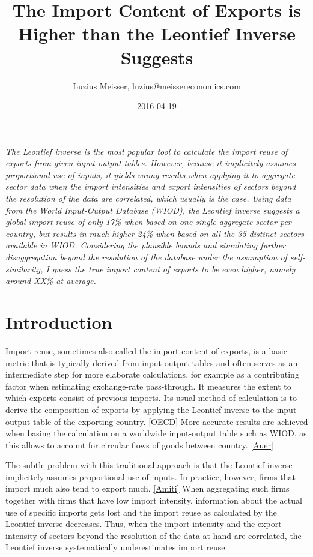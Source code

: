 \documentclass[english]{uzhpub}
\begin{document}
\title{The Import Content of Exports is Higher than the Leontief Inverse Suggests}


\author{Luzius Meisser, luzius@meissereconomics.com}

\date{2016-04-19}

\maketitle

\emph{The Leontief inverse is the most popular tool to calculate the import reuse of exports from given input-output tables. However, because it implicitely assumes proportional use of inputs, it yields wrong results when applying it to aggregate sector data when the import intensities and export intensities of sectors beyond the resolution of the data are correlated, which usually is the case. Using data from the World Input-Output Database (WIOD), the Leontief inverse suggests a global import reuse of only 17\%  when based on one single aggregate sector per country, but results in much higher 24\% when based on all the 35 distinct sectors available in WIOD. Considering the plausible bounds and simulating further disaggregation beyond the resolution of the database under the assumption of self-similarity, I guess the true import content of exports to be even higher, namely around XX\% at average.}

\section{Introduction}
Import reuse, sometimes also called the import content of exports, is a basic metric that is typically derived from input-output tables and often serves as an intermediate step for more elaborate calculations, for example as a contributing factor when estimating exchange-rate pass-through. It measures the extent to which exports consist of previous imports. Its usual method of calculation is to derive the composition of exports by applying the Leontief inverse to the input-output table of the exporting country. \ref{OECD} More accurate results are achieved when basing the calculation on a worldwide input-output table such as WIOD, as this allows to account for circular flows of goods between country. \ref{Auer}

The subtle problem with this traditional approach is that the Leontief inverse implicitely assumes proportional use of inputs. In practice, however, firms that import much also tend to export much. \ref{Amiti} When aggregating such firms together with firms that have low import intensity, information about the actual use of specific imports gets lost and the import reuse as calculated by the Leontief inverse decreases. Thus, when the import intensity and the export intensity of sectors beyond the resolution of the data at hand are correlated, the Leontief inverse systematically underestimates import reuse.
\end{document}
